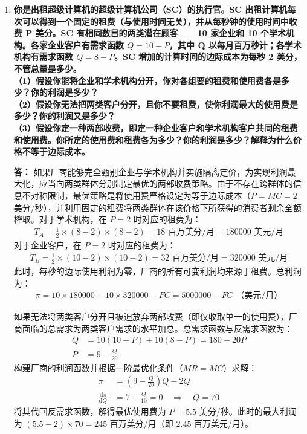 \begin{enumerate}[label=\textbf{\arabic*.}, leftmargin=*]
		\item \textbf{你是出租超级计算机的超级计算机公司（SC）的执行官。SC 出租计算机每次可以得到一个固定的租费（与使用时间无关），并从每秒钟的使用时间中收费 P 美分。SC 有相同数目的两类潜在顾客——10 家企业和 10 个学术机构。各家企业客户有需求函数 $Q = 10 - P$，其中 Q 以每月百万秒计；各学术机构有需求函数 $Q = 8 - P$。SC 增加的计算时间的边际成本为每秒 2 美分，不管总量是多少。\\（1）假设你能将企业和学术机构分开，你对各组要的租费和使用费各是多少？你的利润是多少？\\（2）假设你无法把两类客户分开，且你不要租费，使你利润最大的使用费是多少？你的利润又是多少？\\（3）假设你定一种两部收费，即定一种企业客户和学术机构客户共同的租费和使用费。你所定的使用费和租费各为多少？你的利润是多少？解释为什么价格不等于边际成本。}
		
		\textbf{答：}
		如果厂商能够完全甄别企业与学术机构并实施隔离定价，为实现利润最大化，应当向两类群体分别制定最优的两部收费策略。由于不存在跨群体的信息不对称限制，最优策略是将使用费严格设定为等于边际成本（$P=MC=2$ 美分/秒），并利用固定的租费将两类群体在该价格下所获得的消费者剩余全额榨取。对于学术机构，在 $P=2$ 时对应的租费为：
		\[
		\begin{aligned}
			T_A = \frac{1}{2} \times (8 - 2) \times (8 - 2) = 18 \text{ 百万美分/月} = 180000 \text{ 美元/月}
		\end{aligned}
		\]
		对于企业客户，在 $P=2$ 时对应的租费为：
		\[
		\begin{aligned}
			T_B = \frac{1}{2} \times (10 - 2) \times (10 - 2) = 32 \text{ 百万美分/月} = 320000 \text{ 美元/月}
		\end{aligned}
		\]
		此时，每秒的边际使用利润为零，厂商的所有可变利润均来源于租费。总利润为：
		\[
		\begin{aligned}
			\pi = 10 \times 180000 + 10 \times 320000 - FC = 5000000 - FC \text{ （美元/月）}
		\end{aligned}
		\]
		
		如果无法将两类客户分开且被迫放弃两部收费（即仅收取单一的使用费），厂商面临的总需求为两类客户需求的水平加总。总需求函数与反需求函数为：
		\[
		\begin{aligned}
			Q &= 10(10 - P) + 10(8 - P) = 180 - 20P \\
			P &= 9 - \frac{Q}{20}
		\end{aligned}
		\]
		构建厂商的利润函数并根据一阶最优化条件（$MR = MC$）求解：
		\[
		\begin{aligned}
			\pi &= \left(9 - \frac{Q}{20}\right)Q - 2Q \\
			\frac{\mathrm{d}\pi}{\mathrm{d}Q} &= 7 - \frac{Q}{10} = 0 \quad \Rightarrow \quad Q = 70
		\end{aligned}
		\]
		将其代回反需求函数，解得最优使用费为 $P = 5.5$ 美分/秒。此时的最大利润为 $(5.5 - 2) \times 70 = 245$ 百万美分/月（即 $2.45$ 百万美元/月）。
		

\end{enumerate}
